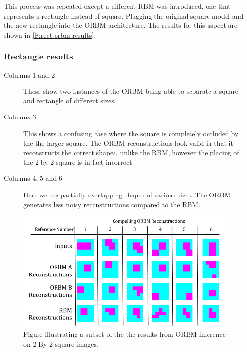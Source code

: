 This process was repeated except a different RBM was introduced, one that represents a rectangle instead of square. Plugging the original square model and the new rectangle into the ORBM architecture. The results for this aspect are shown in \ref{F:rect-orbm-results}.

\subsubsection{Rectangle results}
\begin{description}
  \item[Columns 1 and 2] These show two instances of the ORBM being able to separate a square and rectangle of different sizes.
  \item[Columns 3] This shows a confusing case where the square is completely occluded by the the larger square. The ORBM reconstructions look valid in that it reconstructs the correct shapes, unlike the RBM, however the placing of the 2 by 2 square is in fact incorrect.
  \item[Columns 4, 5 and 6] Here we see partially overlapping shapes of various sizes. The ORBM generates less noisy reconstructions compared to the RBM.
\end{description}




\begin{figure}[htb]
  \begin{center}
    \includegraphics[width=\textwidth]{Assets/results/sq-orbm-results.png}
  \end{center}
  \caption{Figure illustrating a subset of the the results from ORBM inference on 2 By 2 square images.}
  \label{F:sq-orbm-results}
\end{figure}

